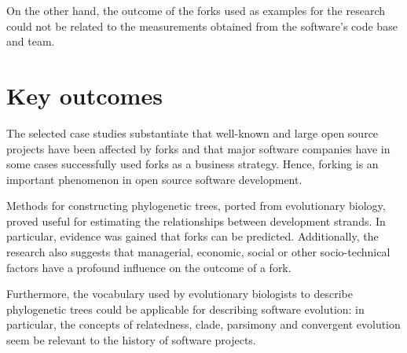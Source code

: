 On the other hand, the outcome of the forks used as examples for the research could not be related to the measurements obtained from the software's code base and team.

\section*{Key outcomes}

The selected case studies substantiate that well-known and large open source projects have been affected by forks and that major software companies have in some cases successfully used forks as a business strategy. Hence, forking is an important phenomenon in open source software development.

Methods for constructing phylogenetic trees, ported from evolutionary biology, proved useful for estimating the relationships between development strands. In particular, evidence was gained that forks can be predicted. Additionally, the research also suggests that managerial, economic, social or other socio-technical factors have a profound influence on the outcome of a fork.

Furthermore, the vocabulary used by evolutionary biologists to describe phylogenetic trees could be applicable for describing software evolution: in particular, the concepts of relatedness, clade, parsimony and convergent evolution seem be relevant to the history of software projects.






  

